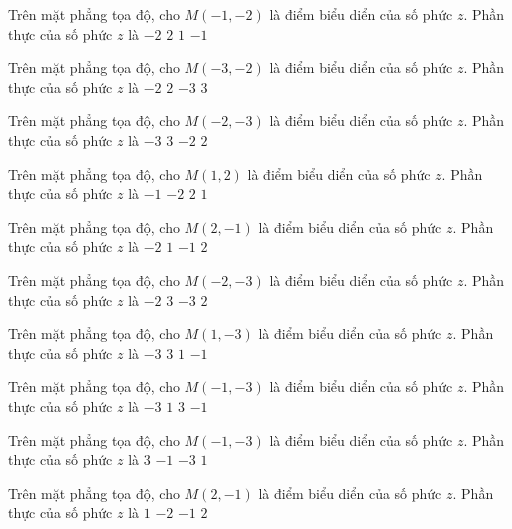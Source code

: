 \begin{ex}
 Trên mặt phẳng tọa độ, cho $M(-1,-2)$ là điểm biểu diển của số phức $z$. Phần thực của số phức $z$ là
\choice
{$-2$}
{$2$}
{$1$}
{\True $-1$}
\end{ex}
\begin{ex}
 Trên mặt phẳng tọa độ, cho $M(-3,-2)$ là điểm biểu diển của số phức $z$. Phần thực của số phức $z$ là
\choice
{$-2$}
{$2$}
{\True $-3$}
{$3$}
\end{ex}
\begin{ex}
 Trên mặt phẳng tọa độ, cho $M(-2,-3)$ là điểm biểu diển của số phức $z$. Phần thực của số phức $z$ là
\choice
{$-3$}
{$3$}
{\True $-2$}
{$2$}
\end{ex}
\begin{ex}
 Trên mặt phẳng tọa độ, cho $M(1,2)$ là điểm biểu diển của số phức $z$. Phần thực của số phức $z$ là
\choice
{$-1$}
{$-2$}
{$2$}
{\True $1$}
\end{ex}
\begin{ex}
 Trên mặt phẳng tọa độ, cho $M(2,-1)$ là điểm biểu diển của số phức $z$. Phần thực của số phức $z$ là
\choice
{$-2$}
{$1$}
{$-1$}
{\True $2$}
\end{ex}
\begin{ex}
 Trên mặt phẳng tọa độ, cho $M(-2,-3)$ là điểm biểu diển của số phức $z$. Phần thực của số phức $z$ là
\choice
{\True $-2$}
{$3$}
{$-3$}
{$2$}
\end{ex}
\begin{ex}
 Trên mặt phẳng tọa độ, cho $M(1,-3)$ là điểm biểu diển của số phức $z$. Phần thực của số phức $z$ là
\choice
{$-3$}
{$3$}
{\True $1$}
{$-1$}
\end{ex}
\begin{ex}
 Trên mặt phẳng tọa độ, cho $M(-1,-3)$ là điểm biểu diển của số phức $z$. Phần thực của số phức $z$ là
\choice
{$-3$}
{$1$}
{$3$}
{\True $-1$}
\end{ex}
\begin{ex}
 Trên mặt phẳng tọa độ, cho $M(-1,-3)$ là điểm biểu diển của số phức $z$. Phần thực của số phức $z$ là
\choice
{$3$}
{\True $-1$}
{$-3$}
{$1$}
\end{ex}
\begin{ex}
 Trên mặt phẳng tọa độ, cho $M(2,-1)$ là điểm biểu diển của số phức $z$. Phần thực của số phức $z$ là
\choice
{$1$}
{$-2$}
{$-1$}
{\True $2$}
\end{ex}

